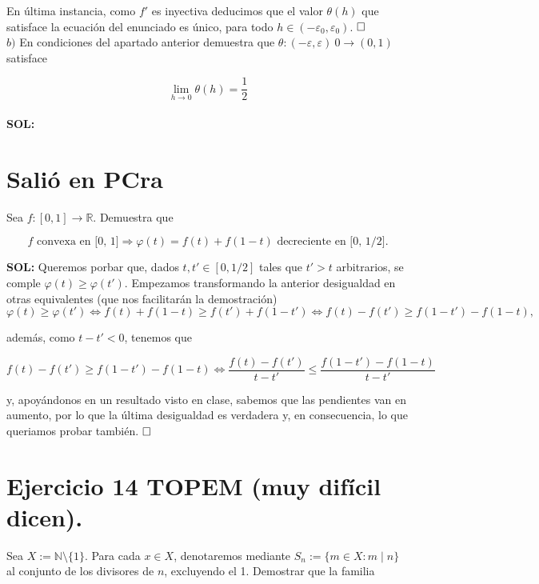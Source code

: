 \documentclass{article}
\begin{document}
En última instancia, como $f'$ es inyectiva deducimos que el valor $\theta(h)$ que satisface la ecuación del enunciado es único, para todo $h \in (-\varepsilon_0, \varepsilon_0)$. $\hfill\square$ \\

$b)$ En condiciones del apartado anterior demuestra que $\theta : (-\varepsilon, \varepsilon) \ {0} \longrightarrow (0, 1)$ satisface

\[\lim_{h \to 0} \theta(h) = \frac{1}{2}\] \\

\noindent\textbf{SOL:} 

\newpage

\section{Salió en PCra}

Sea $f : [0, 1] \longrightarrow \mathbb{R}$. Demuestra que 

\[
f \text{ convexa en [0, 1]} \Longrightarrow \varphi(t) = f(t) + f(1 - t) \text{ decreciente en [0, 1/2].}
\]

\noindent\textbf{SOL:} Queremos porbar que, dados $t, t' \in [0, 1/2]$ tales que $t' > t$ arbitrarios, se comple $\varphi(t) \geq \varphi(t')$. Empezamos transformando la anterior desigualdad en otras equivalentes (que nos facilitarán la demostración)
\[\varphi(t) \geq \varphi(t') \iff f(t) + f(1 - t) \geq f(t') + f(1 - t') \iff f(t) - f(t') \geq f(1 - t') - f(1 - t),\]

\noindent además, como $t - t' < 0$, tenemos que

\[f(t) - f(t') \geq f(1 - t') - f(1 - t) \iff \frac{f(t) - f(t')}{t - t'} \leq \frac{f(1 - t') - f(1 - t)}{t - t'}\]

\noindent y, apoyándonos en un resultado visto en clase, sabemos que las pendientes van en aumento, por lo que la última desigualdad es verdadera y, en consecuencia, lo que queriamos probar también. $\hfill\square$

\newpage

\section{Ejercicio 14 TOPEM (muy difícil dicen).}

Sea $X := \mathbb{N} \setminus \{1\}$. Para cada $x \in X$, denotaremos mediante $S_n := \{m \in X : m \mid n\}$ al conjunto de los divisores de $n$, excluyendo el 1. Demostrar que la familia 
\end{document}
